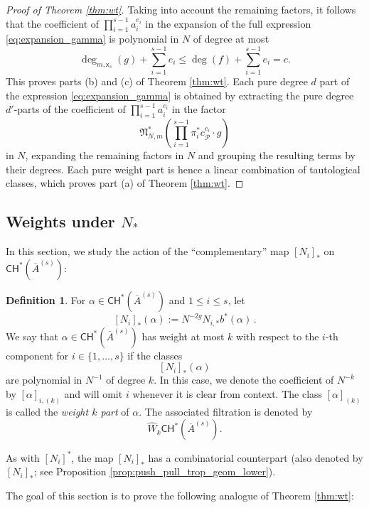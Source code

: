 \documentclass[11pt]{article}
\def\CH{\mathsf{CH}}
\newcommand{\barA}{\overline{A}}
\theoremstyle{definition}
\newtheorem{definition}{Definition}[section]
\begin{document}
\begin{proof}[Proof of Theorem \ref{thm:wt}]
	Taking into account the remaining factors, it follows that the coefficient of $\prod_{i=1}^{s-1}a_i^{e_i}$ in the expansion of the
	full expression \ref{eq:expansion_gamma} is polynomial in $N$ of degree at most
	$$\deg_{m,\mathsf{x}_s}(g)+\sum_{i=1}^{s-1}e_i\le \deg(f)+\sum_{i=1}^{s-1}e_i=c.$$
	This proves parts (b) and (c) of Theorem \ref{thm:wt}.
	Each pure degree $d$ part of the expression \ref{eq:expansion_gamma} is obtained by extracting the pure degree
	$d'$-parts of the coefficient of $\prod_{i=1}^{s-1}a_i^{c_i}$ in the factor
	$$\mathfrak{N}_{N,m}^{\ast}\left(\prod_{i=1}^{s-1}\pi_i^{\ast}c_{\mathcal P}^{c_i}\cdot g \right)$$
	in $N$, expanding the remaining factors in $N$ and grouping the resulting terms by their degrees. Each pure weight part
	is hence a linear combination of tautological classes, which proves
	part (a) of Theorem \ref{thm:wt}.
\end{proof}

\subsection{Weights under \texorpdfstring{$N_{\ast}$}{N*}}\label{sec:Nlow}
In this section, we study the action of the ``complementary'' map $[N_i]_{\ast}$ on $\CH^{\ast}(\barA^{(s)})$:

\begin{definition}
	For $\alpha\in \CH^{\ast}(\barA^{(s)})$ and $1\le i\le s$, let
	$$
    [N_i]_{\ast}(\alpha):=N^{-2g}N_{i,\ast}b^{\ast}(\alpha)\,.
    $$
    We say that $\alpha\in \CH^{\ast}(\barA^{(s)})$ has weight at most $k$ with respect to the $i$-th component for $i\in\{1,\dots,s\}$ if the classes
    $$
    [N_i]_{\ast}(\alpha)
    $$
    are polynomial in $N^{-1}$ of degree $k$. In this case, we denote the coefficient of
    $N^{-k}$ by $[\alpha]_{i,(k)}$ and will omit $i$ whenever it is clear from context.
    The class $[\alpha]_{(k)}$ is called the \emph{weight $k$ part} of $\alpha$. The associated filtration is denoted by
    $$
    \widehat{W}_k\CH^*(\barA^{(s)}).
    $$
\end{definition}
As with $[N_i]^{\ast}$, the map $[N_i]_{\ast}$ has a combinatorial counterpart (also denoted by $[N_i]_{\ast}$; see Proposition \ref{prop:push_pull_trop_geom_lower}).

The goal of this section is to prove the following analogue of Theorem \ref{thm:wt}:
\end{document}

